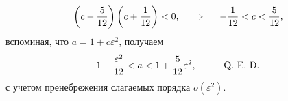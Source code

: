 \begin{equation*}
    \left(
        c - \frac{5}{12}
    \right) \left(
        c  + \frac{1}{12}
    \right) < 0,
    \hspace{0.5cm} \Rightarrow \hspace{0.5cm}
    -\frac{1}{12} < c < \frac{5}{12},
\end{equation*}
вспоминая, что $a = 1 + c \varepsilon^2$, получаем
\begin{equation*}
    1 - \frac{\varepsilon^2}{12} < a < 1 + \frac{5}{12}\varepsilon^2,
    \hspace{1 cm}
    \text{Q. E. D.}
\end{equation*}
с учетом пренебрежения слагаемых порядка $o(\varepsilon^2)$.

